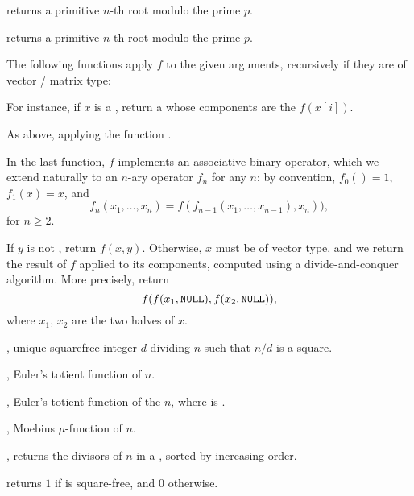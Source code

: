  returns a primitive $n$-th root modulo
the prime $p$.

 returns a primitive $n$-th root
modulo the prime $p$.


The following functions apply $f$ to the given arguments, recursively
if they are of vector / matrix type:

 For instance, if $x$ is a
, return a  whose components are the $f(x[i])$.

 As above, applying the
function .



In the last function, $f$ implements an associative binary operator, which we
extend naturally to an $n$-ary operator $f_n$ for any $n$: by convention,
$f_0() = 1$, $f_1(x) = x$, and
$$ f_n(x_1,\dots,x_n) = f( f_{n-1}(x_1,\dots,x_{n-1}), x_n)),$$
for $n \geq 2$.

 If $y$ is not
, return $f(x,y)$. Otherwise, $x$ must be of vector type, and we
return the result of $f$ applied to its components, computed using a
divide-and-conquer algorithm. More precisely, return
$$f( f(x_1,{\tt NULL}), f(x_2,{\tt NULL}) ),$$
where $x_1$, $x_2$ are the two halves of $x$.


, unique squarefree integer $d$ dividing $n$ such
that $n/d$ is a square.

, Euler's totient function of $n$.

, Euler's totient function of the
 $n$, where  is .

, Moebius $\mu$-function of $n$.

, returns the divisors of $n$ in a
, sorted by increasing order.

 returns $1$ if 
is square-free, and $0$ otherwise.

